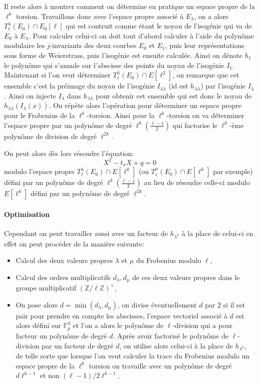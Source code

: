 \documentclass[10pt,a4paper]{book}
\theoremstyle{plain}
\theoremstyle{definition}
\theoremstyle{definition}
\theoremstyle{definition}
\theoremstyle{definition}
\theoremstyle{remark}
\theoremstyle{remark}
\theoremstyle{definition}
\begin{document}
Il reste alors à montrer comment on détermine en pratique un espace propre de la $\ell^k$ torsion. Travaillons donc avec l'espace propre associé à $E_{\lambda}$, on a alors $T_{\ell}^{\lambda}(E_0) \cap E_0[\ell]$ qui est contruit comme étant le noyau de l'isogénie qui va de $E_0$ à $E_{\lambda}$. Pour calculer celui-ci on doit tout d'abord calculer à l'aide du polynôme modulaire les $j$-invariants des deux courbes $E_0$ et $E_1$, puis leur représentations sous forme de Weierstrass, puis l'isogénie est ensuite calculée. Ainsi on dénote $h_1$ le polynôme qui s'annule sur l'abscisse des points du noyau de l'isogénie $I_1$. 
Maintenant si l'on veut déterminer $T_{\ell}^{\lambda}(E_0) \cap E[\ell^2]$, on remarque que cet ensemble c'est la préimage du noyau de l'isogénie $I_{\lambda \lambda}$ (id est $h_{\lambda \lambda}$) par l'isogénie $I_{\lambda}$. Ainsi on injecte $I_{\lambda}$ dans $h_{\lambda \lambda}$ pour obtenir cet ensemble qui est donc le noyau de $h_{\lambda \lambda}(I_{\lambda}(x))$. On répète alors l'opération pour déterminer un espace propre pour le Frobenius de la $\ell^k$-torsion. Ainsi pour la $\ell^k$-torsion on va déterminer l'espace propre par un polynôme de degré $\ell^k  (\frac{\ell-1}{2})$ qui factorise le $\ell^k$-ème polynôme de division de degré $\ell^{2k}$.

On peut alors dès lors résoudre l'équation:
\begin{equation*}
X^2-t_{\pi}X+q=0
\end{equation*}
modulo l'espace propre $T_{\ell}^{\lambda}(E_0) \cap E[\ell^k]$ (ou $T_{\ell}^{\mu}(E_0) \cap E[\ell^k]$ par exemple) défini par un polynôme de degré $\ell^k  (\frac{\ell-1}{2})$ au lieu de résoudre celle-ci modulo $E[\ell^k]$ défini par un polynôme de degré $\ell^{2k}$.

\paragraph{Optimisation}
Cependant on peut travailler aussi avec un facteur de $h_{\lambda^k}$ à la place de celui-ci en effet on peut procéder de la manière suivante:
\begin{itemize}
\item Calcul des deux valeurs propres $\lambda$ et $\mu$ du Frobenius modulo $\ell$,
\item Calcul des ordres multiplicatifs $d_{\lambda},d_{\mu}$ de ces deux valeurs propres dans le groupe multiplicatif $(\mathbb{Z}/\ell \mathbb{Z})^{\times}$,
\item On pose alors $d=\min(d_{\lambda},d_{\mu})$, on divise éventuellement $d$ par $2$ si il est pair pour prendre en compte les abscisses, l'espace vectoriel associé à $d$ est alors défini sur $\mathbb{F}_p^{d}$ et l'on a alors le polynôme de $\ell$-division qui a pour facteur un polynôme de degré $d$. Après avoir factorisé le polynôme de $\ell$-division par un facteur de degré $d$, on utilise alors celui-ci à la place de $h_{\lambda^{k}}$, de telle sorte que lorsque l'on veut calculer la trace du Frobenius modulo un espace propre de la $\ell^k$ torsion on travaille avec un polynôme de degré $d \ell^{k-1}$ et non $(\ell -1)/2 \ell^{k-1}$.
\end{itemize}
\end{document}
